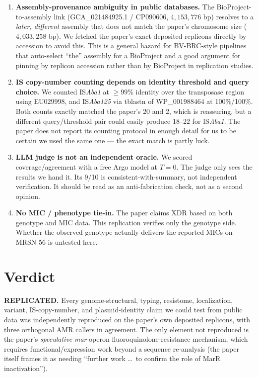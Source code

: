 \documentclass[11pt]{article}
\begin{document}
\begin{enumerate}[leftmargin=1.5em]
\item \textbf{Assembly-provenance ambiguity in public databases.} The BioProject-to-assembly link (GCA\_021484925.1 / CP090606, $4{,}153{,}776$ bp) resolves to a \emph{later, different} assembly that does not match the paper's chromosome size ($4{,}033{,}258$ bp). We fetched the paper's exact deposited replicons directly by accession to avoid this. This is a general hazard for BV-BRC-style pipelines that auto-select ``the'' assembly for a BioProject and a good argument for pinning by replicon accession rather than by BioProject in replication studies.
\item \textbf{IS copy-number counting depends on identity threshold and query choice.} We counted IS\emph{Aba1} at $\geq$99\% identity over the transposase region using EU029998, and IS\emph{Aba125} via tblastn of WP\_001988464 at 100\%/100\%. Both counts exactly matched the paper's 20 and 2, which is reassuring, but a different query/threshold pair could easily produce 18--22 for IS\emph{Aba1}. The paper does not report its counting protocol in enough detail for us to be certain we used the same one --- the exact match is partly luck.
\item \textbf{LLM judge is not an independent oracle.} We scored coverage/agreement with a free Argo model at $T{=}0$. The judge only sees the results we hand it. Its 9/10 is consistent-with-summary, not independent verification. It should be read as an anti-fabrication check, not as a second opinion.
\item \textbf{No MIC / phenotype tie-in.} The paper claims XDR based on both genotype and MIC data. This replication verifies only the genotype side. Whether the observed genotype actually delivers the reported MICs on MRSN 56 is untested here.
\end{enumerate}

\section{Verdict}
\textbf{REPLICATED.} Every genome-structural, typing, resistome, localization, variant, IS-copy-number, and plasmid-identity claim we could test from public data was independently reproduced on the paper's own deposited replicons, with three orthogonal AMR callers in agreement. The only element not reproduced is the paper's \emph{speculative} \emph{mar}-operon fluoroquinolone-resistance mechanism, which requires functional/expression work beyond a sequence re-analysis (the paper itself frames it as needing ``further work \ldots\ to confirm the role of MarR inactivation'').
\end{document}
